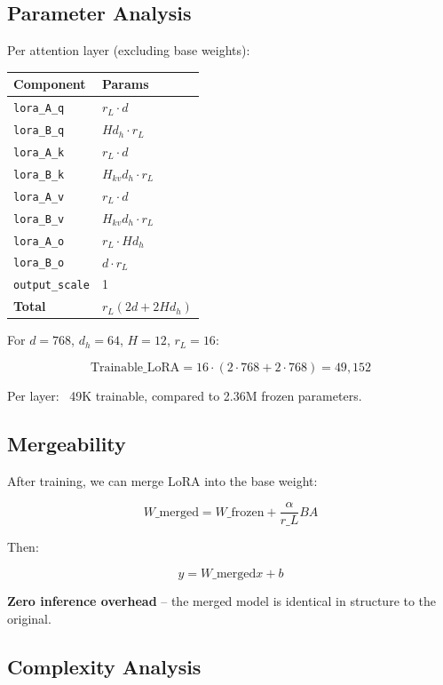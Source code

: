 \subsection{Parameter Analysis}

Per attention layer (excluding base weights):

\begin{table}[H]
\centering
\small
\begin{tabular}{ll}
\toprule
\textbf{Component} & \textbf{Params} \\
\midrule
\texttt{lora\_A\_q} & $r_L \cdot d$ \\
\texttt{lora\_B\_q} & $H d_h \cdot r_L$ \\
\texttt{lora\_A\_k} & $r_L \cdot d$ \\
\texttt{lora\_B\_k} & $H_{kv} d_h \cdot r_L$ \\
\texttt{lora\_A\_v} & $r_L \cdot d$ \\
\texttt{lora\_B\_v} & $H_{kv} d_h \cdot r_L$ \\
\texttt{lora\_A\_o} & $r_L \cdot H d_h$ \\
\texttt{lora\_B\_o} & $d \cdot r_L$ \\
\texttt{output\_scale} & 1 \\
\textbf{Total} & $r_L (2d + 2 H d_h)$ \\
\bottomrule
\end{tabular}
\end{table}

For $d = 768$, $d_h = 64$, $H = 12$, $r_L = 16$:

\[
\text{Trainable}\_\text{LoRA} = 16 \cdot (2 \cdot 768 + 2 \cdot 768) = 49,152
\tag{4.2}
\]

Per layer: ~49K trainable, compared to 2.36M frozen parameters.

\subsection{Mergeability}

After training, we can merge LoRA into the base weight:

\[
W\_\text{merged} = W\_\text{frozen} + \frac{\alpha}{r\_L} B A
\tag{4.3}
\]

Then:

\[
y = W\_\text{merged} x + b
\tag{4.4}
\]

\textbf{Zero inference overhead} -- the merged model is identical in structure to 
the original.

\subsection{Complexity Analysis}

